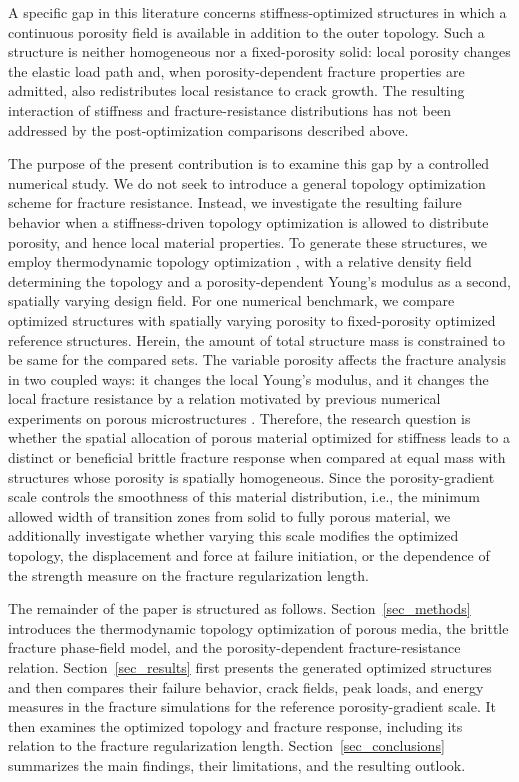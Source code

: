 \documentclass[
	pdflatex,
	sn-mathphys-num
]{sn-jnl}
\theoremstyle{thmstyleone}%
\theoremstyle{thmstyletwo}%
\theoremstyle{thmstylethree}%
\begin{document}
A specific gap in this literature concerns stiffness-optimized
structures in which a continuous porosity field is available in
addition to the outer topology. Such a structure is neither
homogeneous nor a fixed-porosity solid: local porosity changes
the elastic load path and, when porosity-dependent fracture
properties are admitted, also redistributes local resistance to
crack growth. The resulting interaction of stiffness and
fracture-resistance distributions has not been addressed by the
post-optimization comparisons described above.

The purpose of the present contribution is to examine this gap
by a controlled numerical study. We do not seek to
introduce a general topology optimization scheme for fracture
resistance. Instead, we investigate the resulting
failure behavior when
a stiffness-driven topology optimization is allowed to
distribute porosity, and hence local material properties. To generate these structures, we
employ thermodynamic topology optimization
\cite{jantos_evolutionary_2016,jantos_accurate_2019,junker_new_2021},
with a relative density field determining the topology and a
porosity-dependent Young's modulus as a second, spatially
varying design field. For one numerical benchmark, we compare
optimized structures with spatially varying porosity to
fixed-porosity optimized reference structures. Herein, the amount of total structure mass is constrained to be same for the compared sets. 
The
variable porosity affects the
fracture analysis in two coupled ways: it changes the local
Young's modulus, and it changes the local fracture resistance
by a relation motivated by previous numerical experiments
on porous microstructures
\cite{schluter_determination_2025a}. Therefore, the research 
question is whether the spatial allocation of porous material
optimized for stiffness leads to a distinct or beneficial brittle
fracture response when compared at equal mass with structures
whose porosity is spatially homogeneous.
Since the porosity-gradient scale controls the smoothness of
this material distribution, i.e., the minimum allowed width of
transition zones from solid to fully porous material, we additionally investigate whether
varying this scale modifies the optimized topology, the
displacement and force at failure initiation, or the dependence
of the strength measure on the fracture regularization length.

The remainder of the paper is structured as follows.
Section~\ref{sec_methods} introduces the thermodynamic topology
optimization of porous media, the brittle fracture phase-field
model, and the porosity-dependent fracture-resistance relation.
Section~\ref{sec_results} first presents the generated
optimized structures and then compares their failure behavior,
crack fields, peak loads, and energy measures in the fracture
simulations for the reference porosity-gradient scale. It then
examines the optimized topology and fracture response, including its
relation to the fracture regularization length.
Section~\ref{sec_conclusions} summarizes the main
findings, their limitations, and the resulting outlook.
\end{document}
